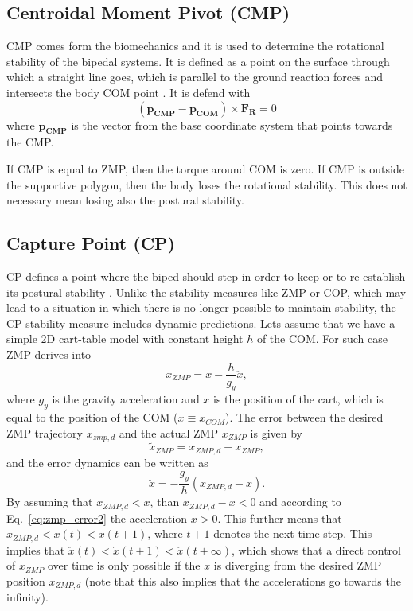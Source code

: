 \documentclass[12pt,a4paper,twoside]{article}
\begin{document}
\subsection{Centroidal Moment Pivot (CMP)}

CMP comes form the biomechanics and it is used to determine the rotational stability of the bipedal systems. It is defined as a point on the surface through which a straight line goes, which is parallel to the ground reaction forces and intersects the body COM point \cite{Goswami2004,Popovic2005}. It is defend with
\begin{equation}
(\bm{p_{CMP}} - \bm{p_{COM}}) \times \bm{F_{R}} = 0
\label{e14}
\end{equation}
where $\bm{p_{CMP}}$ is the vector from the base coordinate system that points towards the CMP.

If CMP is equal to ZMP, then the torque around COM is zero. If CMP is outside the supportive polygon, then the body loses the rotational stability. This does not necessary mean losing also the postural stability. 


\subsection{{Capture Point (CP)}}

CP defines a point where the biped should step in order to keep or to re-establish its postural stability \cite{Pratt2006, Koolen2012}. Unlike the stability measures like ZMP or COP, which may lead to a situation in which there is no longer possible to maintain stability, the CP stability measure includes dynamic predictions. Lets assume that we have a simple 2D cart-table model with constant height $h$ of the COM. For such case ZMP derives into
\begin{equation}
x_{ZMP} = x - \frac{h}{g_y}\ddot{x}, 
\end{equation}  
where $g_y$ is the gravity acceleration and $x$ is the position of the cart, which is equal to the position of the COM ($x\equiv x_{COM}$). The error between the desired ZMP trajectory $x_{zmp,d}$ and the actual ZMP $x_{ZMP}$ is given by
\begin{equation}
\tilde{x}_{ZMP} = x_{ZMP,d} - x_{ZMP},
\end{equation}
and the error dynamics can be written as
\begin{equation}
\ddot{x} = - \frac{g_y}{h} (x_{ZMP,d} - x).
\label{eq:zmp_error2}
\end{equation}
By assuming that $x_{ZMP,d} < x$, than $x_{ZMP,d} - x < 0$ and according to Eq.~\ref{eq:zmp_error2} the acceleration $\ddot{x} > 0$. This further means that $x_{ZMP,d}  < x(t) < x(t+1)$, where $t+1$ denotes the next time step. This implies that $\ddot{x}(t) < \ddot{x}(t+1) < \ddot{x}(t+\infty)$, which shows that a direct control of $x_{ZMP}$ over time is only possible if the $x$ is diverging from the desired ZMP position $x_{ZMP,d}$ (note that this also implies that the accelerations go towards the infinity).
\end{document}
